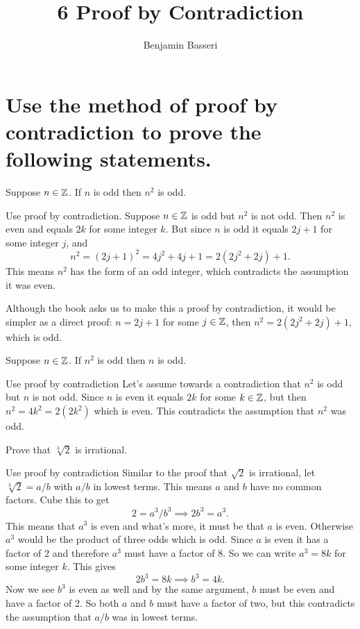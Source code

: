 \documentclass{article}
\title{6 Proof by Contradiction}
\author{Benjamin Basseri}
\begin{document}
\maketitle

\section{Use the method of proof by contradiction to prove the following statements.}

\begin{problem}
Suppose $n \in \mathbb{Z}$. If $n$ is odd then $n^2$ is odd.
\end{problem}

\begin{solution}{Use proof by contradiction.}
  Suppose $n \in \mathbb{Z}$ is odd but $n^2$ is not odd. Then $n^2$ is even and equals $2k$ for some integer $k$. But since $n$ is odd it equals $2j + 1$ for some integer $j$, and
  $$n^2 = (2j + 1)^2 = 4j^2 + 4j + 1 = 2(2j^2 + 2j) + 1.$$
  This means $n^2$ has the form of an odd integer, which contradicts the assumption it was even.

  Although the book asks us to make this a proof by contradiction, it would be simpler as a direct proof: $n = 2j + 1$ for some $j \in \mathbb{Z}$, then $n^2 = 2(2j^2 + 2j) + 1$, which is odd.
\end{solution}

\begin{problem}
Suppose $n \in \mathbb{Z}$. If $n^2$ is odd then $n$ is odd.
\end{problem}

\begin{solution}{Use proof by contradiction}
  Let's assume towards a contradiction that $n^2$ is odd but $n$ is not odd. Since $n$ is even it equals $2k$ for some $k \in \mathbb{Z}$, but then $n^2 = 4k^2 = 2(2k^2)$ which is even. This contradicts the assumption that $n^2$ was odd.
\end{solution}

\begin{problem}
Prove that $\sqrt[3]{2}$ is irrational.
\end{problem}

\begin{solution}{Use proof by contradiction}
  Similar to the proof that $\sqrt{2}$ is irrational, let $\sqrt[3]{2} = a/b$ with $a/b$ in lowest terms. This means $a$ and $b$ have no common factors. Cube this to get
  $$2 = a^3 / b^3 \implies 2b^3 = a^3.$$
  This means that $a^3$ is even and what's more, it must be that $a$ is even. Otherwise $a^3$ would be the product of three odds which is odd. Since $a$ is even it has a factor of $2$ and therefore $a^3$ must have a factor of 8. So we can write $a^3 = 8k$ for some integer $k$. This gives
  $$2b^3 = 8k \implies b^3 = 4k.$$
  Now we see $b^3$ is even as well and by the same argument, $b$ must be even and have a factor of 2. So both $a$ and $b$ must have a factor of two, but this contradicts the assumption that $a/b$ was in lowest terms.
\end{solution}
\end{document}
